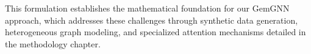 This formulation establishes the mathematical foundation for our GemGNN approach, which addresses these challenges through synthetic data generation, heterogeneous graph modeling, and specialized attention mechanisms detailed in the methodology chapter.

\EndChapter
